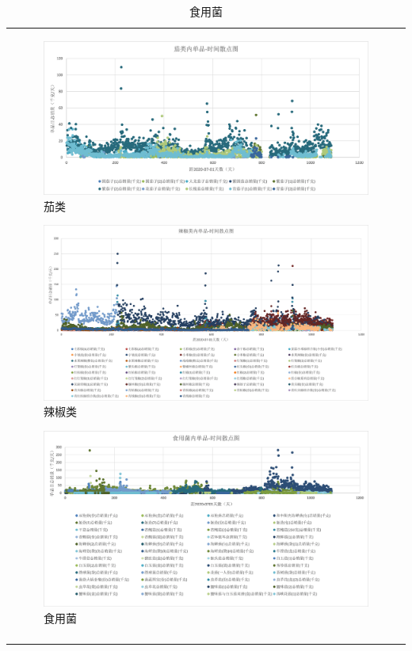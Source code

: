 \documentclass{my_paper}
\begin{document}
\begin{table}[H]
\begin{tabular}{|p{14.0cm}|}
\begin{figure}[H]
 \centering
 \includegraphics[width=\textwidth]{Pic/茄类.png} %
 \caption{茄类} %
 \label{茄类} %
\end{figure}

\begin{figure}[H]
 \centering
 \includegraphics[width=\textwidth]{Pic/辣椒类.png} %
 \caption{辣椒类} %
 \label{辣椒类} %
\end{figure}

\begin{figure}[H]
 \centering
 \includegraphics[width=\textwidth]{Pic/食用菌.png} %
 \caption{食用菌} %
 \label{食用菌} %
\end{figure}
    \\
    \\
\hline
    \end{tabular}
\end{table}\newpage
\end{document}
